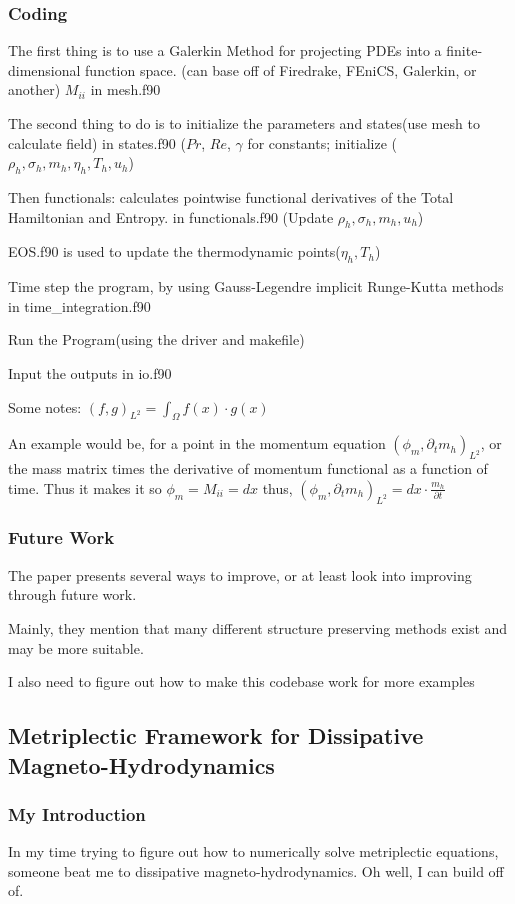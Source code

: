 \subsubsection{Coding}
The first thing is to use a Galerkin Method for projecting PDEs into a finite-dimensional function space. (can base off of Firedrake, FEniCS, Galerkin, or another) $M_{ii}$ in mesh.f90

The second thing to do is to initialize the parameters and states(use mesh to calculate field) in states.f90
($Pr$, $Re$, $\gamma$ for constants; initialize ($\rho_h, \sigma_h, m_h, \eta_h, T_h, u_h$)


Then functionals: calculates pointwise functional derivatives of the Total Hamiltonian and Entropy. in functionals.f90
(Update $\rho_h, \sigma_h, m_h, u_h$)

EOS.f90 is used to update the thermodynamic points($\eta_h, T_h$)

Time step the program, by using Gauss-Legendre implicit Runge-Kutta methods in time\_integration.f90

Run the Program(using the driver and makefile)

Input the outputs in io.f90

Some notes: $(f,g)_{L^2}=\int_\Omega f(x) \cdot g(x)$

An example would be, for a point in the momentum equation $(\phi_m, \partial_t m_h)_{L^2}$, or the mass matrix times the derivative of momentum functional as a function of time. Thus it makes it so $\phi_m=M_{ii}=dx$ thus, $(\phi_m, \partial_t m_h)_{L^2}=dx\cdot\frac{m_h}{\partial t}$

\subsubsection{Future Work}
The paper presents several ways to improve, or at least look into improving through future work.

Mainly, they mention that many different structure preserving methods exist and may be more suitable.

I also need to figure out how to make this codebase work for more examples



\subsection{Metriplectic Framework for
 Dissipative Magneto-Hydrodynamics}
\subsubsection{My Introduction}
In my time trying to figure out how to numerically solve metriplectic equations, someone beat me to dissipative magneto-hydrodynamics. Oh well, I can build off of.

